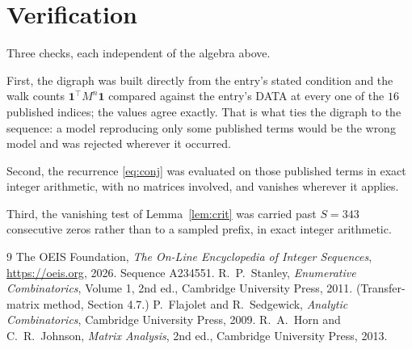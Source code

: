 \documentclass[11pt,a4paper]{article}
\theoremstyle{plain}
\theoremstyle{definition}
\begin{document}
\section{Verification}

Three checks, each independent of the algebra above.

First, the digraph was built directly from the entry's stated condition and the walk counts
$\mathbf{1}^{\!\top}M^{n}\mathbf{1}$ compared against the entry's DATA at every one of
the $16$ published indices; the values agree exactly. That is what ties the digraph to
the sequence: a model reproducing only some published terms would be the wrong model and
was rejected wherever it occurred.

Second, the recurrence \eqref{eq:conj} was evaluated on those published terms in exact
integer arithmetic, with no matrices involved, and vanishes wherever it applies.

Third, the vanishing test of Lemma~\ref{lem:crit} was carried past $S=343$ consecutive
zeros rather than to a sampled prefix, in exact integer arithmetic.

\begin{thebibliography}{9}
 The OEIS Foundation, \emph{The On-Line Encyclopedia of Integer
Sequences}, \url{https://oeis.org}, 2026. Sequence A234551.
 R.~P.~Stanley, \emph{Enumerative Combinatorics}, Volume 1, 2nd ed.,
Cambridge University Press, 2011. (Transfer-matrix method, Section 4.7.)
 P.~Flajolet and R.~Sedgewick, \emph{Analytic Combinatorics}, Cambridge
University Press, 2009.
 R.~A.~Horn and C.~R.~Johnson, \emph{Matrix Analysis}, 2nd ed., Cambridge
University Press, 2013.
\end{thebibliography}
\end{document}
